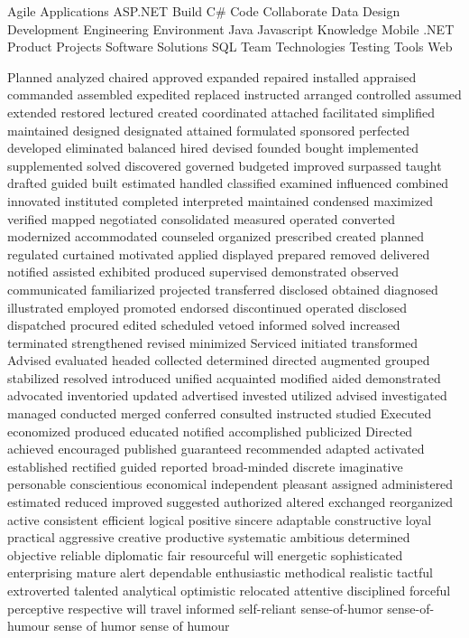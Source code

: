 \documentclass[]{friggeri-cv} %
\begin{document}
\keyword
{
Agile
Applications
ASP.NET
Build
C\#
Code
Collaborate
Data
Design
Development
Engineering
Environment
Java
Javascript
Knowledge
Mobile
.NET
Product
Projects
Software
Solutions
SQL
Team
Technologies
Testing
Tools
Web
}

\keyword
{
Planned
analyzed
chaired
approved
expanded
repaired
installed
appraised
commanded
assembled
expedited
replaced
instructed
arranged
controlled
assumed
extended
restored
lectured
created
coordinated
attached
facilitated
simplified
maintained
designed
designated
attained
formulated
sponsored
perfected
developed
eliminated
balanced
hired
devised
founded
bought
implemented
supplemented
solved
discovered
governed
budgeted
improved
surpassed
taught
drafted
guided
built
estimated
handled
classified
examined
influenced
combined
innovated
instituted
completed
interpreted
maintained
condensed
maximized
verified
mapped
negotiated
consolidated
measured
operated
converted
modernized
accommodated
counseled
organized
prescribed
created
planned
regulated
curtained
motivated
applied
displayed
prepared
removed
delivered
notified
assisted
exhibited
produced
supervised
demonstrated
observed
communicated
familiarized
projected
transferred
disclosed
obtained
diagnosed
illustrated
employed
promoted
endorsed
discontinued
operated
disclosed
dispatched
procured
edited
scheduled
vetoed
informed
solved
increased
terminated
strengthened
revised
minimized
Serviced
initiated
transformed
Advised
evaluated
headed
collected
determined
directed
augmented
grouped
stabilized
resolved
introduced
unified
acquainted
modified
aided
demonstrated
advocated
inventoried
updated
advertised
invested
utilized
advised
investigated
managed
conducted
merged
conferred
consulted
instructed
studied
Executed
economized
produced
educated
notified
accomplished
publicized
Directed
achieved
encouraged
published
guaranteed
recommended
adapted
activated
established
rectified
guided
reported
broad-minded
discrete
imaginative
personable
conscientious
economical
independent
pleasant
assigned
administered
estimated
reduced
improved
suggested
authorized
altered
exchanged
reorganized
active
consistent
efficient
logical
positive
sincere
adaptable
constructive
loyal
practical
aggressive
creative
productive
systematic
ambitious
determined
objective
reliable
diplomatic
fair
resourceful
will
energetic
sophisticated
enterprising
mature
alert
dependable
enthusiastic
methodical
realistic
tactful
extroverted
talented
analytical
optimistic
relocated
attentive
disciplined
forceful
perceptive
respective
will
travel
informed
self-reliant
sense-of-humor
sense-of-humour
sense of humor
sense of humour
}

\newpage
\end{document}
